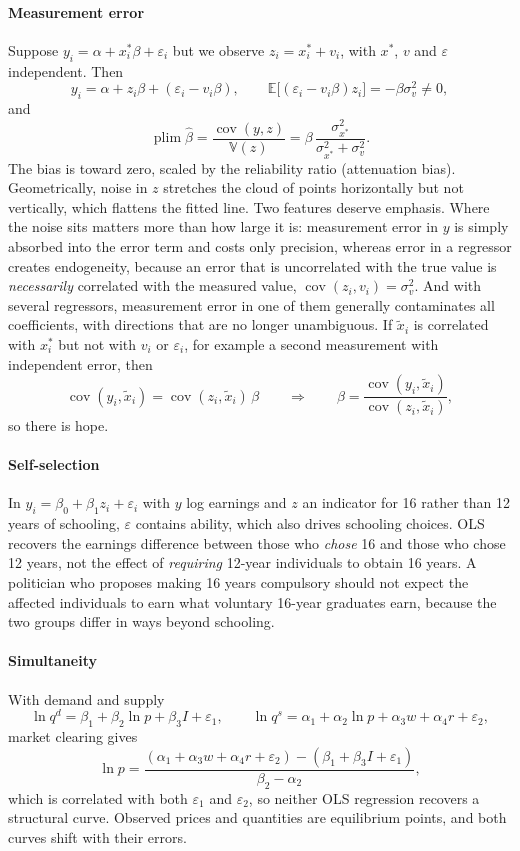 \documentclass[11pt,a4paper]{article}
\newcommand{\E}{\mathbb{E}}
\newcommand{\V}{\mathbb{V}}
\newcommand{\Cov}{\operatorname{cov}}
\newcommand{\plim}{\operatorname*{plim}}
\newcommand{\bh}{\hat\beta}
\begin{document}
\paragraph{Measurement error}
Suppose $y_i=\alpha+x_i^*\beta+\varepsilon_i$ but we observe $z_i=x_i^*+v_i$, with $x^*$, $v$ and $\varepsilon$ independent. Then
\[
y_i=\alpha+z_i\beta+(\varepsilon_i-v_i\beta),\qquad\E\big[(\varepsilon_i-v_i\beta)z_i\big]=-\beta\sigma_v^2\neq0,
\]
and
\[
\plim\bh=\frac{\Cov(y,z)}{\V(z)}=\beta\,\frac{\sigma_{x^*}^2}{\sigma_{x^*}^2+\sigma_v^2}.
\]
The bias is toward zero, scaled by the reliability ratio (attenuation bias). Geometrically, noise in $z$ stretches the cloud of points horizontally but not vertically, which flattens the fitted line. Two features deserve emphasis. Where the noise sits matters more than how large it is: measurement error in $y$ is simply absorbed into the error term and costs only precision, whereas error in a regressor creates endogeneity, because an error that is uncorrelated with the true value is \emph{necessarily} correlated with the measured value, $\Cov(z_i,v_i)=\sigma_v^2$. And with several regressors, measurement error in one of them generally contaminates all coefficients, with directions that are no longer unambiguous. If $\tilde x_i$ is correlated with $x_i^*$ but not with $v_i$ or $\varepsilon_i$, for example a second measurement with independent error, then
\[
\Cov(y_i,\tilde x_i)=\Cov(z_i,\tilde x_i)\,\beta\qquad\Longrightarrow\qquad\beta=\frac{\Cov(y_i,\tilde x_i)}{\Cov(z_i,\tilde x_i)},
\]
so there is hope.

\paragraph{Self-selection}
In $y_i=\beta_0+\beta_1z_i+\varepsilon_i$ with $y$ log earnings and $z$ an indicator for 16 rather than 12 years of schooling, $\varepsilon$ contains ability, which also drives schooling choices. OLS recovers the earnings difference between those who \emph{chose} 16 and those who chose 12 years, not the effect of \emph{requiring} 12-year individuals to obtain 16 years. A politician who proposes making 16 years compulsory should not expect the affected individuals to earn what voluntary 16-year graduates earn, because the two groups differ in ways beyond schooling.

\paragraph{Simultaneity}
With demand and supply
\[
\ln q^d=\beta_1+\beta_2\ln p+\beta_3I+\varepsilon_1,\qquad \ln q^s=\alpha_1+\alpha_2\ln p+\alpha_3w+\alpha_4r+\varepsilon_2,
\]
market clearing gives
\[
\ln p=\frac{(\alpha_1+\alpha_3w+\alpha_4r+\varepsilon_2)-(\beta_1+\beta_3I+\varepsilon_1)}{\beta_2-\alpha_2},
\]
which is correlated with both $\varepsilon_1$ and $\varepsilon_2$, so neither OLS regression recovers a structural curve. Observed prices and quantities are equilibrium points, and both curves shift with their errors.
\end{document}

